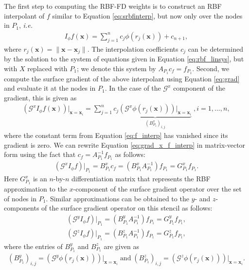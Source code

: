 \documentclass[smallextended]{svjour3}
\def\calG{{ \mathcal G}}
\newcommand{\vX}{ \mathbf{x} }
\newcommand{\lf}{\left}
\newcommand{\rt}{\right}
\begin{document}
The first step to computing the RBF-FD weights is to construct an RBF interpolant of $f$ similar to Equation \eqref{eq:srbfinterp}, but now only over the nodes in $P_1$, \emph{i.e.}
%
\begin{align}
I_{\phi}f(\vX) = \sum_{j=1}^n c_j\phi(r_j(\vX)) + c_{n+1},
\label{eq:f_interp}
\end{align}
%
where $r_j(\vX) = \|\vX-\vX_j\|$.  The interpolation coefficients $c_j$ can be determined by the solution to the system of equations given in Equation \eqref{eq:rbf_linsys}, but with $X$ replaced with $P_1$;  we denote this system by $A_{P_1} c_f = f_{P_1}$.   Second, we compute the surface gradient of the above interpolant using Equation \eqref{eq:grad} and evaluate it at the nodes in $P_1$.  In the case of the $\calG^x$ component of the gradient, this is given as
%
\begin{align}
\lf( \calG^x I_{\phi}f(\vX) \rt)\bigr|_{\vX = \vX_i} = \sum_{j=1}^n c_j \underbrace{\lf(\calG^x \phi(r_j(\vX)) \rt)\bigr|_{\vX=\vX_i}}_{{\lf(B^x_{P_1}\rt)}_{i,j}}\; , i=1,\ldots,n,
\label{eq:grad_x_f_interp}
\end{align}
%
where the constant term from Equation \eqref{eq:f_interp} has vanished since its gradient is zero.  We can rewrite Equation \eqref{eq:grad_x_f_interp} in matrix-vector form using the fact that $c_f = A_{P_1}^{-1} f_{P_1}$ as follows:
\begin{align}
\lf( \calG^x I_{\phi}f \rt)\bigr|_{P_1} = B^x_{P_1} c_f = \lf(B^x_{P_1} A^{-1}_{P_1}\rt)f_{P_1} = G_{P_1}^x f_{P_1}.
\end{align}
%
Here $G_{P_1}^x$ is an $n$-by-$n$ differentiation matrix that represents the RBF approximation to the $x$-component of the surface gradient operator over the set of nodes in $P_1$.  Similar approximations can be obtained to the $y$- and $z$-components of the surface gradient operator on this stencil as follows:
%
\begin{align}
\lf( \calG^y I_{\phi}f \rt)\bigr|_{P_1} = \lf(B^y_{P_1} A^{-1}_{P_1}\rt)f_{P_1} = G_{P_1}^y f_{P_1}, \\
\lf( \calG^z I_{\phi}f \rt)\bigr|_{P_1} = \lf(B^z_{P_1} A^{-1}_{P_1}\rt)f_{P_1} = G_{P_1}^z f_{P_1},
\end{align}
%
where the entries of $B^y_{P_1}$ and $B^z_{P_1}$ are given as
%
\begin{align*}
(B^y_{P_1})_{i,j} = \lf(\calG^y \phi(r_j(\vX))\rt)\bigr|_{\vX=\vX_i} \; \text{and}\; (B^z_{P_1})_{i,j} = \lf(\calG^z \phi(r_j(\vX))\rt)\bigr|_{\vX=\vX_i}.
\end{align*}
\end{document}
